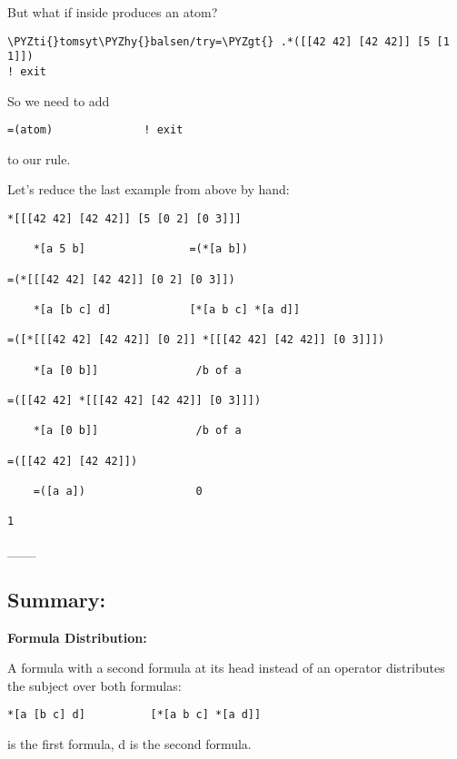 But what if \kode{*[a b]} inside \kode{=(*[a b])} produces an atom?

\begin{framed_shaded}
\begin{Verbatim}[fontsize=\relsize{-2.5},fontseries=b,commandchars=\\\{\}]
\PYZti{}tomsyt\PYZhy{}balsen/try=\PYZgt{} .*([[42 42] [42 42]] [5 [1 1]])    
! exit
\end{Verbatim}
\end{framed_shaded}
So we need to add

\begin{framed_shaded}
\begin{Verbatim}[fontsize=\relsize{-2.5},fontseries=b,commandchars=\\\{\}]
=(atom)              ! exit
\end{Verbatim}
\end{framed_shaded}
to our rule. 

Let's reduce the last example from above by hand:

\begin{framed_shaded}
\begin{Verbatim}[fontsize=\relsize{-2.5},fontseries=b,commandchars=\\\{\}]
*[[[42 42] [42 42]] [5 [0 2] [0 3]]]

    *[a 5 b]                =(*[a b])

=(*[[[42 42] [42 42]] [0 2] [0 3]])

    *[a [b c] d]            [*[a b c] *[a d]] 

=([*[[[42 42] [42 42]] [0 2]] *[[[42 42] [42 42]] [0 3]]])

    *[a [0 b]]               /b of a

=([[42 42] *[[[42 42] [42 42]] [0 3]]])

    *[a [0 b]]               /b of a

=([[42 42] [42 42]])

    =([a a])                 0 

1
\end{Verbatim}
\end{framed_shaded}
\_\_\_

\subsection{Summary:}

\textbf{Formula Distribution:}

A formula with a second formula at its head instead of an operator distributes the subject over both formulas:
\begin{framed_shaded}
\begin{Verbatim}[fontsize=\relsize{-2.5},fontseries=b,commandchars=\\\{\}]
*[a [b c] d]          [*[a b c] *[a d]]  
\end{Verbatim}
\end{framed_shaded}
\kode{[b c]} is the first formula, d is the second formula.

